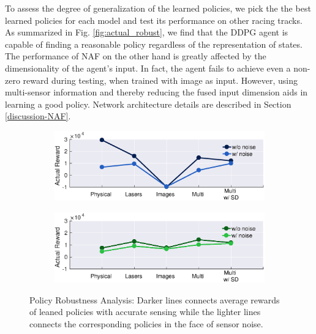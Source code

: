 \documentclass[../thesis.tex]{subfiles}
\begin{document}
To assess the degree of generalization of the learned policies, we pick the the best learned policies for each model and test its performance on other racing tracks. As summarized in Fig. \ref{fig:actual_robust}, we find that the DDPG agent is capable of finding a reasonable policy regardless of the representation of states. The performance of NAF on the other hand is greatly affected by the dimensionality of the agent's input. In fact, the agent fails to achieve even a non-zero reward during testing, when trained with image as input. However, using multi-sensor information and thereby reducing the fused input dimension aids in learning a good policy. Network architecture details are described in Section \ref{discussion-NAF}.

\begin{figure}[t]
	\centering
	\begin{subfigure}[b]{0.4\linewidth}
		\includegraphics[width=0.9\columnwidth]{./MultimodalDRL/fig/actual_robust_naf}
		\label{fig:actual_robust_naf}
	\end{subfigure}
	\begin{subfigure}[b]{0.4\linewidth}
		\includegraphics[width=0.9\columnwidth]{./MultimodalDRL/fig/actual_robust_ddpg}
		\label{fig:actual_robust_ddpg}
	\end{subfigure}
	\caption{Policy Robustness Analysis: Darker lines connects average rewards of leaned policies with accurate sensing while the lighter lines connects the corresponding policies in the face of sensor noise.}
\end{figure}
\end{document}
